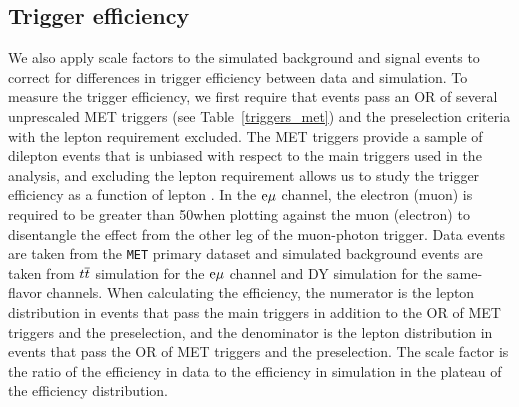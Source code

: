 \subsection{Trigger efficiency}
\label{trigger_eff}
We also apply scale factors to the simulated background and signal events to correct for differences in trigger efficiency between data and simulation. To measure the trigger efficiency, we first require that events pass an OR of several unprescaled MET triggers (see Table~\ref{triggers_met}) and the preselection criteria with the lepton \pt requirement excluded. The MET triggers provide a sample of dilepton events that is unbiased with respect to the main triggers used in the analysis, and excluding the lepton \pt requirement allows us to study the trigger efficiency as a function of lepton \pt. In the $\mathrm{e}{\mu}$ channel, the electron (muon) \pt is required to be greater than 50\GeV when plotting against the muon (electron) \pt to disentangle the effect from the other leg of the muon-photon trigger. Data events are taken from the \texttt{MET} primary dataset and simulated background events are taken from $t\overline{t}$ simulation for the $\mathrm{e}{\mu}$ channel and DY simulation for the same-flavor channels. When calculating the efficiency, the numerator is the lepton \pt distribution in events that pass the main triggers in addition to the OR of MET triggers and the preselection, and the denominator is the lepton \pt distribution in events that pass the OR of MET triggers and the preselection. The scale factor is the ratio of the efficiency in data to the efficiency in simulation in the plateau of the efficiency distribution.



\pagebreak